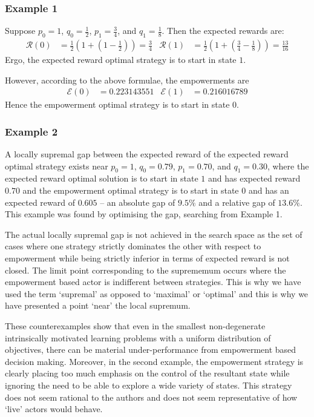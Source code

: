 \documentclass{article}
\newcommand{\Ee}{\mathcal{E}}
\newcommand{\Rr}{\mathcal{R}}
\begin{document}
\subsubsection{Example 1}
Suppose $p_0=1$, $q_0=\frac{1}{2}$, $p_1=\frac{3}{4}$, and $q_1 = \frac{1}{8}$. Then the expected rewards are:
\begin{align*}
\Rr(0) &= \frac{1}{2}\left(1+\left(1-\frac{1}{2}\right)\right)=\frac{3}{4} & 
\Rr(1) &= \frac{1}{2}\left(1+\left(\frac{3}{4}-\frac{1}{8}\right)\right)=\frac{13}{16}
\end{align*}
Ergo, the expected reward optimal strategy is to start in state $1$.

However, according to the above formulae, the empowerments are
\begin{align*}
\Ee(0)&=0.223143551 & 
\Ee(1)&=0.216016789 
\end{align*}
Hence the empowerment optimal strategy is to start in state $0$.

\subsubsection{Example 2}
A locally supremal gap between the expected reward of the expected reward optimal strategy exists near $p_0=1$, $q_0=0.79$, $p_1=0.70$, and $q_1 = 0.30$, where the expected reward optimal solution is to start in state $1$ and has expected reward $0.70$ and the empowerment optimal strategy is to start in state $0$ and has an expected reward of $0.605$ -- an absolute gap of $9.5\%$ and a relative gap of $13.6\%$. This example was found by optimising the gap, searching from Example 1.

The actual locally supremal gap is not achieved in the search space as the set of cases where one strategy strictly dominates the other with respect to empowerment while being strictly inferior in terms of expected reward is not closed. The limit point corresponding to the suprememum occurs where the empowerment based actor is indifferent between strategies. This is why we have used the term `supremal' as opposed to `maximal' or `optimal' and this is why we have presented a point `near' the local supremum.

These counterexamples show that even in the smallest non-degenerate intrinsically motivated learning problems with a uniform distribution of objectives, there can be material under-performance from empowerment based decision making. Moreover, in the second example, the empowerment strategy is clearly placing too much emphasis on the control of the resultant state while ignoring the need to be able to explore a wide variety of states. This strategy does not seem rational to the authors and does not seem representative of how `live' actors would behave.
\end{document}
